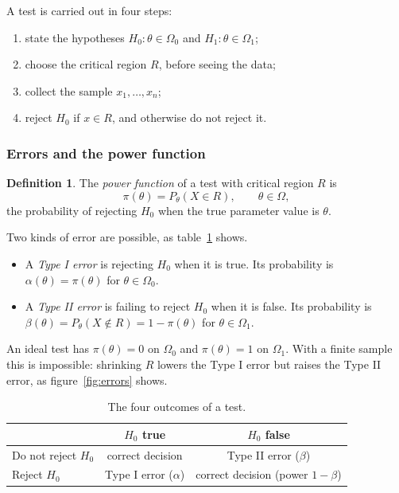\documentclass[12pt,a4paper]{report}
\theoremstyle{definition}
\newtheorem{definition}[thm]{Definition}
\theoremstyle{plain}
\begin{document}
A test is carried out in four steps:
\begin{enumerate}
\item state the hypotheses $H_0\colon\theta\in\Omega_0$ and
$H_1\colon\theta\in\Omega_1$;
\item choose the critical region $R$, before seeing the data;
\item collect the sample $x_1,\dots,x_n$;
\item reject $H_0$ if $x\in R$, and otherwise do not reject it.
\end{enumerate}

\subsubsection{Errors and the power function}

\begin{definition}
\label{def:power}
The \emph{power function} of a test with critical region $R$ is
\[\pi(\theta) = P_\theta(X\in R),\qquad \theta\in\Omega ,\]
the probability of rejecting $H_0$ when the true parameter value is $\theta$.
\end{definition}

Two kinds of error are possible, as table~\ref{tab:errors} shows.
\begin{itemize}
\item A \emph{Type I error} is rejecting $H_0$ when it is true. Its probability
is $\alpha(\theta) = \pi(\theta)$ for $\theta\in\Omega_0$.
\item A \emph{Type II error} is failing to reject $H_0$ when it is false. Its
probability is $\beta(\theta) = P_\theta(X\notin R) = 1 - \pi(\theta)$ for
$\theta\in\Omega_1$.
\end{itemize}
An ideal test has $\pi(\theta)=0$ on $\Omega_0$ and $\pi(\theta)=1$ on
$\Omega_1$. With a finite sample this is impossible: shrinking $R$ lowers the
Type I error but raises the Type II error, as figure~\ref{fig:errors} shows.

\begin{table}[H]
\centering
\caption{The four outcomes of a test.}
\label{tab:errors}
\renewcommand{\arraystretch}{1.6}
\begin{tabular}{|l|c|c|}
\hline
 & $H_0$ true & $H_0$ false \\ \hline
Do not reject $H_0$ & correct decision & Type II error ($\beta$) \\ \hline
Reject $H_0$ & Type I error ($\alpha$) & correct decision (power $1-\beta$) \\ \hline
\end{tabular}
\end{table}
\end{document}
